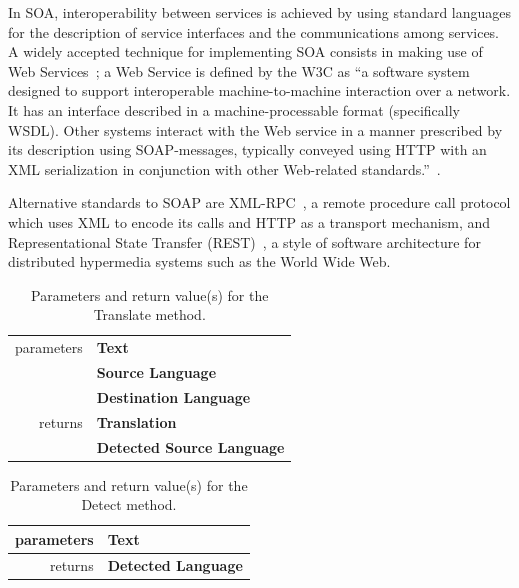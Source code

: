 \documentclass[11pt]{article}
\begin{document}
In SOA, interoperability between services is achieved by using standard languages for the 
description of service interfaces and the communications among services. A widely accepted 
technique for implementing SOA consists in making use of Web Services~\citep{soa}; a Web 
Service is defined by the W3C as ``a software system designed to support interoperable 
machine-to-machine interaction over a network. It has an interface described in a 
machine-processable format (specifically WSDL). Other systems interact with the Web service 
in a manner prescribed by its description using SOAP-messages, typically conveyed using 
HTTP with an XML serialization in conjunction with other Web-related standards.''~\citep{wsgloss}. 

Alternative standards to SOAP are XML-RPC~\citep{xmlrpcspec}, a remote procedure call 
protocol which uses XML to encode its calls and HTTP as a transport mechanism, and 
Representational State Transfer (REST)~\citep{rest}, a style of software architecture 
for distributed hypermedia systems such as the World Wide Web.

\begin{table}[!ht]
\begin{center}
 \begin{tabular}{|r|l|}
  \hline
   parameters	& {\bf Text} \\ \cline{2-2}
   				& {\bf Source Language} \\ \cline{2-2}
   				& {\bf Destination Language} \\ %
  \hline \hline
   returns 	& {\bf Translation} \\ \cline{2-2}
   			& {\bf Detected Source Language} \\
  \hline
 \end{tabular}
\end{center}
\caption{Parameters and return value(s) for the Translate method.}
\label{tab:translate}
\end{table}

\begin{table}[!ht]
\begin{center}
 \begin{tabular}{|r|l|}
  \hline
   parameters	& {\bf Text} \\
  \hline \hline
   returns 	& {\bf Detected Language}\\
  \hline
 \end{tabular}
\end{center}
\caption{Parameters and return value(s) for the Detect method.}
\label{tab:detect}
\end{table}
\end{document}
